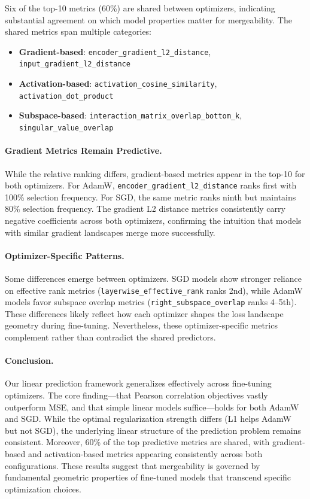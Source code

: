 Six of the top-10 metrics (60\%) are shared between optimizers, indicating substantial agreement on which model properties matter for mergeability. The shared metrics span multiple categories:
\begin{itemize}
    \item \textbf{Gradient-based}: \texttt{encoder\_gradient\_l2\_distance}, \texttt{input\_gradient\_l2\_distance}
    \item \textbf{Activation-based}: \texttt{activation\_cosine\_similarity}, \texttt{activation\_dot\_product}
    \item \textbf{Subspace-based}: \texttt{interaction\_matrix\_overlap\_bottom\_k}, \texttt{singular\_value\_overlap}
\end{itemize}

\paragraph{Gradient Metrics Remain Predictive.}
While the relative ranking differs, gradient-based metrics appear in the top-10 for both optimizers. For AdamW, \texttt{encoder\_gradient\_l2\_distance} ranks first with 100\% selection frequency. For SGD, the same metric ranks ninth but maintains 80\% selection frequency. The gradient L2 distance metrics consistently carry negative coefficients across both optimizers, confirming the intuition that models with similar gradient landscapes merge more successfully.

\paragraph{Optimizer-Specific Patterns.}
Some differences emerge between optimizers. SGD models show stronger reliance on effective rank metrics (\texttt{layerwise\_effective\_rank} ranks 2nd), while AdamW models favor subspace overlap metrics (\texttt{right\_subspace\_overlap} ranks 4--5th). These differences likely reflect how each optimizer shapes the loss landscape geometry during fine-tuning. Nevertheless, these optimizer-specific metrics complement rather than contradict the shared predictors.

\paragraph{Conclusion.}
Our linear prediction framework generalizes effectively across fine-tuning optimizers. The core finding---that Pearson correlation objectives vastly outperform MSE, and that simple linear models suffice---holds for both AdamW and SGD. While the optimal regularization strength differs (L1 helps AdamW but not SGD), the underlying linear structure of the prediction problem remains consistent. Moreover, 60\% of the top predictive metrics are shared, with gradient-based and activation-based metrics appearing consistently across both configurations. These results suggest that mergeability is governed by fundamental geometric properties of fine-tuned models that transcend specific optimization choices.
